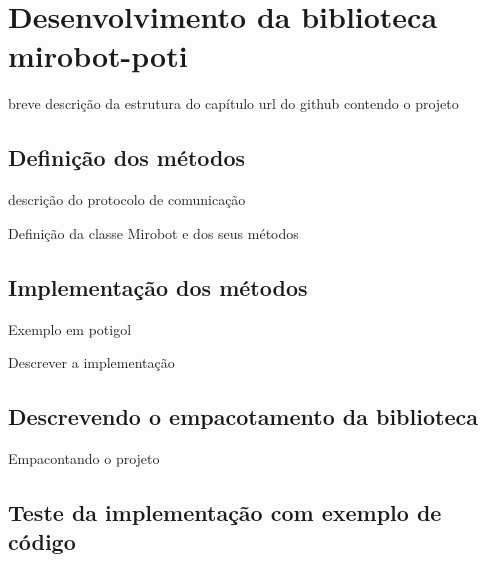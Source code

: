 \chapter{Desenvolvimento da biblioteca mirobot-poti}
\label{cap:descricao}

breve descrição da estrutura do capítulo
url do github contendo o projeto

\section{Definição dos métodos}

descrição do protocolo de comunicação

Definição da classe Mirobot e dos seus métodos

\section{Implementação dos métodos}

Exemplo em potigol

Descrever a implementação

\section{Descrevendo o empacotamento da biblioteca}

Empacontando o projeto

\section{Teste da implementação com exemplo de código}

